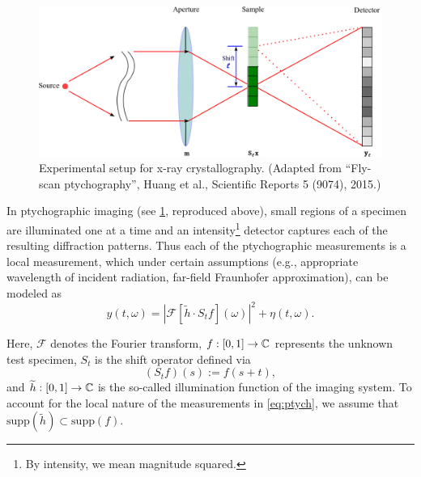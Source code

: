 \begin{figure}
  \centering\includegraphics[scale=0.25]{pics/ptych1D}
  \caption[Experimental setup for x-ray crystallography]
          {Experimental setup for x-ray crystallography.   {\small
              (Adapted from ``Fly-scan ptychography'', Huang et al.,
              Scientific Reports 5 (9074), 2015.)}}
  \label{fig:ptych_setup}
\end{figure}

In ptychographic imaging (see \cref{fig:ptych_setup}, reproduced above), small regions of a specimen are illuminated one at a time and an intensity\footnote{By intensity, we mean magnitude squared.} detector captures each of the resulting diffraction patterns. Thus each of the ptychographic measurements is a local measurement, which under certain assumptions (e.g., appropriate wavelength of incident radiation, far-field Fraunhofer approximation), can be modeled as \cite{dierolf2008ptych,goodman2005introfourieroptics}
\begin{equation}
    y(t, \omega) = \left \vert \mathcal F [ \widetilde h \cdot S_t f ] (\omega) 
       \right \vert^2 + \eta(t, \omega) .\label{eq:ptych}
\end{equation} 

Here, $\mathcal F$ denotes the Fourier transform, $f : [0, 1] \to \mathbb{C}$ represents the unknown test specimen, $S_t$ is the shift operator defined via $$(S_t f)(s) := f(s + t),$$ and $\widetilde h : [0, 1] \to \mathbb{C}$ is the so-called illumination function \cite{marchesini2011iterative} of the imaging system.  To account for the local nature of the measurements in \eqref{eq:ptych}, we assume that $\text{supp}(\widetilde h) \subset \text{supp} (f)$.

